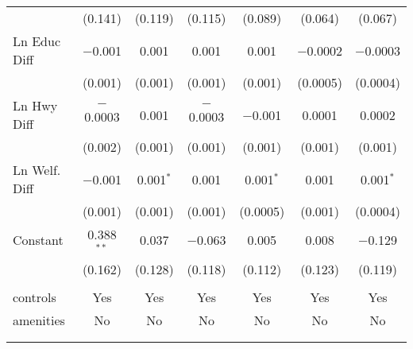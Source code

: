 \begin{table}[!htbp]
\begin{tabular}{@{\extracolsep{5pt}}lcccccc}
  & (0.141) & (0.119) & (0.115) & (0.089) & (0.064) & (0.067) \\ 
  Ln Educ Diff & $-$0.001 & 0.001 & 0.001 & 0.001 & $-$0.0002 & $-$0.0003 \\ 
  & (0.001) & (0.001) & (0.001) & (0.001) & (0.0005) & (0.0004) \\ 
  Ln Hwy Diff & $-$0.0003 & 0.001 & $-$0.0003 & $-$0.001 & 0.0001 & 0.0002 \\ 
  & (0.002) & (0.001) & (0.001) & (0.001) & (0.001) & (0.001) \\ 
  Ln Welf. Diff & $-$0.001 & 0.001$^{*}$ & 0.001 & 0.001$^{*}$ & 0.001 & 0.001$^{*}$ \\ 
  & (0.001) & (0.001) & (0.001) & (0.0005) & (0.001) & (0.0004) \\ 
  Constant & 0.388$^{**}$ & 0.037 & $-$0.063 & 0.005 & 0.008 & $-$0.129 \\ 
  & (0.162) & (0.128) & (0.118) & (0.112) & (0.123) & (0.119) \\ 
 \hline \\[-1.8ex] 
controls & Yes & Yes & Yes & Yes & Yes & Yes \\ 
amenities & No & No & No & No & No & No \\ 
\hline \\[-1.8ex] 
\hline 
\hline \\[-1.8ex] 
\end{tabular} 
\end{table} 
